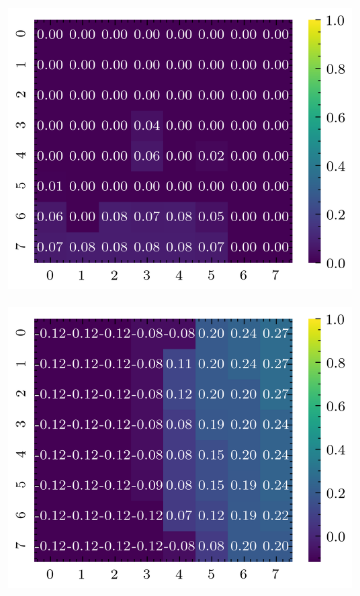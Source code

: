 \documentclass[../document.tex]{subfiles}
\begin{document}
\begin{figure}[H]
\begin{subfigure}[b]{0.19\textwidth}
        \includegraphics[width=\linewidth]{../img/5/quarry/false_positive/heatmap-2d-2.png}
    \end{subfigure}
    \begin{subfigure}[b]{0.19\textwidth}
        \includegraphics[width=\linewidth]{../img/5/quarry/false_positive/heatmap-2d-3.png}
    \end{subfigure}  
    \begin{subfigure}[b]{0.19\textwidth}

\end{subfigure}
\end{figure}
\end{document}
